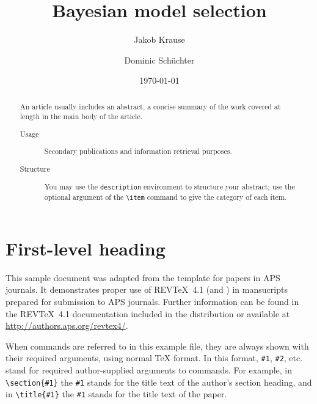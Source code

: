 \documentclass[%
 reprint,
 amsmath,amssymb,
 aps,
]{revtex4-1}
\begin{document}
\title{Bayesian model selection}%

\author{Jakob Krause}
\author{Dominic Schüchter}

\date{\today}%

\begin{abstract}
  An article usually includes an abstract, a concise summary of the work
  covered at length in the main body of the article.
  \begin{description}
  \item[Usage]
    Secondary publications and information retrieval purposes.
  \item[Structure]
    You may use the \texttt{description} environment to structure your abstract;
    use the optional argument of the \verb+\item+ command to give the category of each item.
  \end{description}
\end{abstract}
\maketitle


\section{\label{sec:level1}First-level heading}

This sample document was adapted from the template for papers
in APS journals.
It demonstrates proper use of REV\TeX~4.1 (and
\LaTeXe) in mansucripts prepared for submission to APS
journals. Further information can be found in the REV\TeX~4.1
documentation included in the distribution or available at
\url{http://authors.aps.org/revtex4/}.

When commands are referred to in this example file, they are always
shown with their required arguments, using normal \TeX{} format. In
this format, \verb+#1+, \verb+#2+, etc. stand for required
author-supplied arguments to commands. For example, in
\verb+\section{#1}+ the \verb+#1+ stands for the title text of the
author's section heading, and in \verb+\title{#1}+ the \verb+#1+
stands for the title text of the paper.
\end{document}
